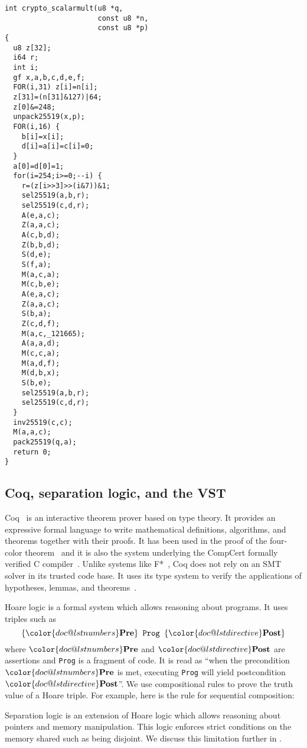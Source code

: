 \begin{lstlisting}[language=Ctweetnacl]
int crypto_scalarmult(u8 *q,
                      const u8 *n,
                      const u8 *p)
{
  u8 z[32];
  i64 r;
  int i;
  gf x,a,b,c,d,e,f;
  FOR(i,31) z[i]=n[i];
  z[31]=(n[31]&127)|64;
  z[0]&=248;
  unpack25519(x,p);
  FOR(i,16) {
    b[i]=x[i];
    d[i]=a[i]=c[i]=0;
  }
  a[0]=d[0]=1;
  for(i=254;i>=0;--i) {
    r=(z[i>>3]>>(i&7))&1;
    sel25519(a,b,r);
    sel25519(c,d,r);
    A(e,a,c);
    Z(a,a,c);
    A(c,b,d);
    Z(b,b,d);
    S(d,e);
    S(f,a);
    M(a,c,a);
    M(c,b,e);
    A(e,a,c);
    Z(a,a,c);
    S(b,a);
    Z(c,d,f);
    M(a,c,_121665);
    A(a,a,d);
    M(c,c,a);
    M(a,d,f);
    M(d,b,x);
    S(b,e);
    sel25519(a,b,r);
    sel25519(c,d,r);
  }
  inv25519(c,c);
  M(a,a,c);
  pack25519(q,a);
  return 0;
}
\end{lstlisting}


\subsection{Coq, separation logic, and the VST}
\label{subsec:Coq-VST}

Coq~\cite{coq-faq} is an interactive theorem prover based on type theory. It
provides an expressive formal language to write mathematical definitions,
algorithms, and theorems together with their proofs. It has been used in the proof
of the four-color theorem~\cite{gonthier2008formal} and it is also the system
underlying the CompCert formally verified C compiler~\cite{Leroy-backend}.
Unlike systems like F*~\cite{DBLP:journals/corr/BhargavanDFHPRR17},
Coq does not rely on an SMT solver in its trusted code base.
It uses its type system to verify the applications of hypotheses,
lemmas, and theorems~\cite{Howard1995-HOWTFN}.

Hoare logic is a formal system which allows reasoning about programs.
It uses triples such as
$$\{{\color{doc@lstnumbers}\textbf{Pre}}\}\texttt{~Prog~}\{{\color{doc@lstdirective}\textbf{Post}}\}$$
where ${\color{doc@lstnumbers}\textbf{Pre}}$ and ${\color{doc@lstdirective}\textbf{Post}}$
are assertions and \texttt{Prog} is a fragment of code.
It is read as
``when the precondition  ${\color{doc@lstnumbers}\textbf{Pre}}$ is met,
executing \texttt{Prog} will yield postcondition ${\color{doc@lstdirective}\textbf{Post}}$''.
We use compositional rules to prove the truth value of a Hoare triple.
For example, here is the rule for sequential composition:
\begin{prooftree}
\end{prooftree}
Separation logic is an extension of Hoare logic which allows reasoning about
pointers and memory manipulation. This logic enforces strict conditions on the
memory shared such as being disjoint.
We discuss this limitation further in .

